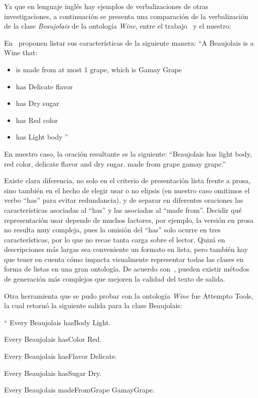 Ya que en lenguaje inglés hay ejemplos de verbalizaciones de otras investigaciones, a continuación se presenta una comparación de la verbalización de la clase \emph{Beaujolais} de la ontología \emph{Wine}, entre el trabajo~\cite{hewlett2005effective} y el nuestro:

En~\cite{hewlett2005effective} proponen listar sus características de la siguiente manera: 
``A Beaujolais is a Wine that:
\begin{itemize}
    \item is made from at most 1 grape, which is Gamay Grape
    \item has Delicate flavor
    \item has Dry sugar 
    \item has Red color
    \item has Light body ''
\end{itemize}

En nuestro caso, la oración resultante es la siguiente:
``Beaujolais has light body, red color, delicate flavor and dry sugar. made from grape gamay grape.''

Existe clara diferencia, no solo en el criterio de presentación lista frente a prosa, sino también en el hecho de elegir usar o no elipsis (en nuestro caso omitimos el verbo ``has'' para evitar redundancia), y de separar en diferentes oraciones las características asociadas al ``has'' y las asociadas al ``made from''. Decidir qué representación usar depende de muchos factores, por ejemplo, la versión en prosa no resulta muy compleja, pues la omisión del ``has'' solo ocurre en tres características, por lo que no recae tanta carga sobre el lector. Quizá en descripciones más largas sea conveniente un formato en lista, pero también hay que tener en cuenta cómo impacta visualmente representar todas las clases en forma de listas en una gran ontología. De acuerdo con~\cite{hewlett2005effective}, pueden existir métodos de generación más complejos que mejoren la calidad del texto de salida.

Otra herramienta que se pudo probar con la ontología \emph{Wine} fue Attempto Tools, la cual retornó la siguiente salida para la clase Beaujolais:

``
Every Beaujolais hasBody Light.

Every Beaujolais hasColor Red.

Every Beaujolais hasFlavor Delicate.

Every Beaujolais hasSugar Dry.

Every Beaujolais madeFromGrape GamayGrape.

